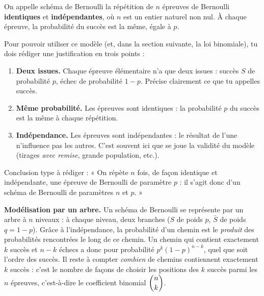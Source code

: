 \documentclass[11pt]{article}
\newcommand{\cle}[1]{{\popxbold\color{popdark}#1}}
\begin{document}
\begin{definition}
On appelle \cle{schéma de Bernoulli} la répétition de $n$ épreuves de Bernoulli \textbf{identiques} et \textbf{indépendantes}, où $n$ est un entier naturel non nul. À chaque épreuve, la probabilité du succès est la même, égale à $p$.
\end{definition}

\begin{methode}
Pour pouvoir utiliser ce modèle (et, dans la section suivante, la loi binomiale), tu dois rédiger une justification en trois points :
\begin{enumerate}
\item \textbf{Deux issues.} Chaque épreuve élémentaire n'a que deux issues : succès $S$ de probabilité $p$, échec de probabilité $1-p$. Précise clairement ce que tu appelles succès.
\item \textbf{Même probabilité.} Les épreuves sont identiques : la probabilité $p$ du succès est la même à chaque répétition.
\item \textbf{Indépendance.} Les épreuves sont indépendantes : le résultat de l'une n'influence pas les autres. C'est souvent ici que se joue la validité du modèle (tirages \emph{avec remise}, grande population, etc.).
\end{enumerate}
Conclusion type à rédiger : « On répète $n$ fois, de façon identique et indépendante, une épreuve de Bernoulli de paramètre $p$ : il s'agit donc d'un schéma de Bernoulli de paramètres $n$ et $p$. »
\end{methode}

\textbf{Modélisation par un arbre.} Un schéma de Bernoulli se représente par un arbre à $n$ niveaux : à chaque niveau, deux branches ($S$ de poids $p$, $\bar{S}$ de poids $q = 1-p$). Grâce à l'indépendance, la probabilité d'un chemin est le \emph{produit} des probabilités rencontrées le long de ce chemin. Un chemin qui contient exactement $k$ succès et $n-k$ échecs a donc pour probabilité $p^k (1-p)^{n-k}$, quel que soit l'ordre des succès. Il reste à compter \emph{combien} de chemins contiennent exactement $k$ succès : c'est le nombre de façons de choisir les positions des $k$ succès parmi les $n$ épreuves, c'est-à-dire le coefficient binomial $\dbinom{n}{k}$.
\end{document}
